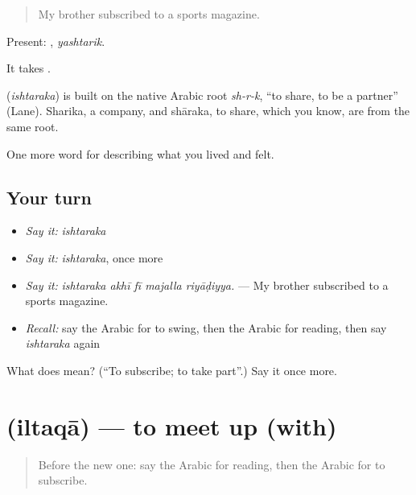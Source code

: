 \begin{quote}
My brother subscribed to a sports magazine.
\end{quote}

Present: , \emph{yashtarik}.

It takes .

\begin{cousinweb}
\textbf{} (\emph{ishtaraka}) is built on the native Arabic root \emph{sh-r-k}, \textquotedblleft{}to share, to be a partner\textquotedblright{} (Lane). Sharika, a company, and shāraka, to share, which you know, are from the same root.
\end{cousinweb}

\begin{grammarlens}[title={What you've built}]
One more word for describing what you lived and felt.
\end{grammarlens}

\subsection*{Your turn}
\begin{itemize}
\raggedright
  \item \emph{Say it:} \emph{ishtaraka}
  \item \emph{Say it:} \emph{ishtaraka}, once more
  \item \emph{Say it:} \emph{ishtaraka akhī fī majalla riyāḍiyya.} — My brother subscribed to a sports magazine.
  \item \emph{Recall:} say the Arabic for to swing, then the Arabic for reading, then say \emph{ishtaraka} again
\end{itemize}

\begin{tcolorbox}[breakable,colback=teal!4,colframe=teal!35!black,title={Before you move on}]
What does  mean? (\textquotedblleft{}To subscribe; to take part\textquotedblright{}.) Say it once more.
\end{tcolorbox}
\section[\texorpdfstring{\ar{التقى} (iltaqā)}{التقى (iltaqā)}]{ (iltaqā) — to meet up (with)}

\label{lesson:AR-C540-iltaqa}



\begin{quote}
Before the new one: say the Arabic for reading, then the Arabic for to subscribe.
\end{quote}

